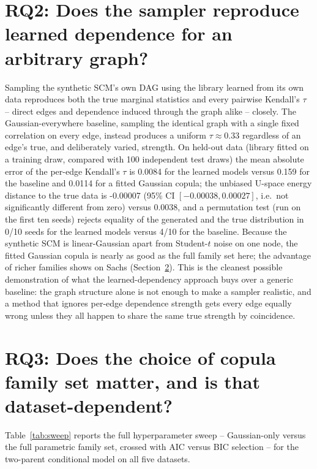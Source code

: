 \documentclass[
  english,
  class=report,
  accentcolor=2c,
  marginpar=false,
  parskip=half-,
  fontsize=11pt,
  ruledheaders=false,
  pdfa=false,
  IMRAD=false,
  thesis={type=master}
]{tudapub}
\begin{document}
\section{RQ2: Does the sampler reproduce learned dependence for an arbitrary graph?}
\label{sec:rq2}
Sampling the synthetic SCM's own DAG using the library learned from its own
data reproduces both the true marginal statistics and every pairwise
Kendall's $\tau$ -- direct edges and dependence induced through the graph
alike -- closely. The Gaussian-everywhere baseline, sampling the identical
graph with a single fixed correlation on every edge, instead produces a
uniform $\tau \approx 0.33$ regardless of an edge's true, and deliberately
varied, strength. On held-out data (library fitted on a training draw, compared with 100
independent test draws) the mean absolute error of the per-edge Kendall's
$\tau$ is 0.0084 for the learned models versus
0.159 for the baseline and
0.0114 for a fitted Gaussian copula; the
unbiased U-space energy distance to the true data is
-0.00007 (95\% CI
$[-0.00038, 0.00027]$, i.e.\ not significantly different from
zero) versus 0.0038, and a permutation test (run on the first
ten seeds) rejects equality of the generated and the true distribution in
0/10 seeds for the learned models versus 4/10 for the baseline. Because the
synthetic SCM is linear-Gaussian apart from Student-$t$ noise on one node,
the fitted Gaussian copula is nearly as good as the full family set here;
the advantage of richer families shows on Sachs (Section~\ref{sec:rq3}). This is the cleanest possible demonstration of what the
learned-dependency approach buys over a generic baseline: the graph
structure alone is not enough to make a sampler realistic, and a method that
ignores per-edge dependence strength gets every edge equally wrong unless
they all happen to share the same true strength by coincidence.

\section{RQ3: Does the choice of copula family set matter, and is that dataset-dependent?}
\label{sec:rq3}
Table~\ref{tab:sweep} reports the full hyperparameter sweep -- Gaussian-only
versus the full parametric family set, crossed with AIC versus BIC
selection -- for the two-parent conditional model on all five datasets.
\end{document}
